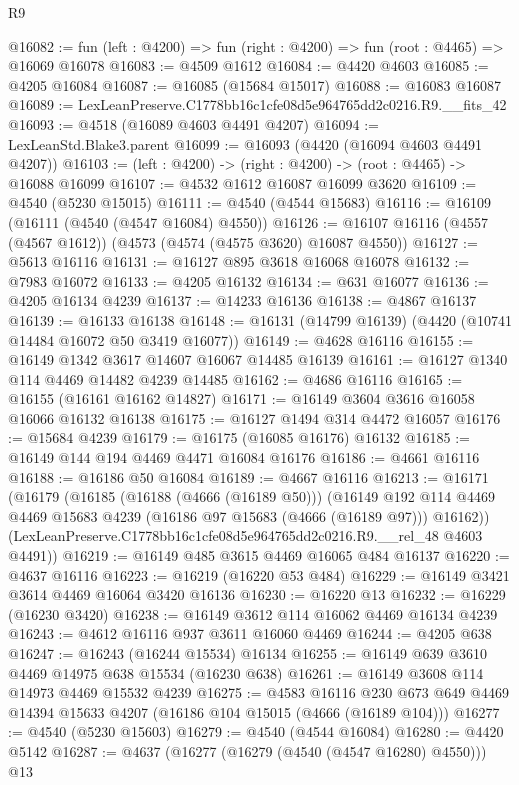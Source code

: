\begin{lexlean}{R9}
\begin{coremodule}
@16082 := fun (left : @4200) => fun (right : @4200) => fun (root : @4465) => @16069 @16078
@16083 := @4509 @1612
@16084 := @4420 @4603
@16085 := @4205 @16084
@16087 := @16085 (@15684 @15017)
@16088 := @16083 @16087
@16089 := LexLeanPreserve.C1778bb16c1cfe08d5e964765dd2c0216.R9.__fits_42
@16093 := @4518 (@16089 @4603 @4491 @4207)
@16094 := LexLeanStd.Blake3.parent
@16099 := @16093 (@4420 (@16094 @4603 @4491 @4207))
@16103 := (left : @4200) -> (right : @4200) -> (root : @4465) -> @16088 @16099
@16107 := @4532 @1612 @16087 @16099 @3620
@16109 := @4540 (@5230 @15015)
@16111 := @4540 (@4544 @15683)
@16116 := @16109 (@16111 (@4540 (@4547 @16084) @4550))
@16126 := @16107 @16116 (@4557 (@4567 @1612)) (@4573 (@4574 (@4575 @3620) @16087 @4550))
@16127 := @5613 @16116
@16131 := @16127 @895 @3618 @16068 @16078
@16132 := @7983 @16072
@16133 := @4205 @16132
@16134 := @631 @16077
@16136 := @4205 @16134 @4239
@16137 := @14233 @16136
@16138 := @4867 @16137
@16139 := @16133 @16138
@16148 := @16131 (@14799 @16139) (@4420 (@10741 @14484 @16072 @50 @3419 @16077))
@16149 := @4628 @16116
@16155 := @16149 @1342 @3617 @14607 @16067 @14485 @16139
@16161 := @16127 @1340 @114 @4469 @14482 @4239 @14485
@16162 := @4686 @16116
@16165 := @16155 (@16161 @16162 @14827)
@16171 := @16149 @3604 @3616 @16058 @16066 @16132 @16138
@16175 := @16127 @1494 @314 @4472 @16057
@16176 := @15684 @4239
@16179 := @16175 (@16085 @16176) @16132
@16185 := @16149 @144 @194 @4469 @4471 @16084 @16176
@16186 := @4661 @16116
@16188 := @16186 @50 @16084
@16189 := @4667 @16116
@16213 := @16171
    (@16179
      (@16185
        (@16188 (@4666 (@16189 @50)))
        (@16149 @192 @114 @4469 @4469 @15683 @4239 (@16186 @97 @15683 (@4666 (@16189 @97))) @16162))
      (LexLeanPreserve.C1778bb16c1cfe08d5e964765dd2c0216.R9.__rel_48 @4603 @4491))
@16219 := @16149 @485 @3615 @4469 @16065 @484 @16137
@16220 := @4637 @16116
@16223 := @16219 (@16220 @53 @484)
@16229 := @16149 @3421 @3614 @4469 @16064 @3420 @16136
@16230 := @16220 @13
@16232 := @16229 (@16230 @3420)
@16238 := @16149 @3612 @114 @16062 @4469 @16134 @4239
@16243 := @4612 @16116 @937 @3611 @16060 @4469
@16244 := @4205 @638
@16247 := @16243 (@16244 @15534) @16134
@16255 := @16149 @639 @3610 @4469 @14975 @638 @15534 (@16230 @638)
@16261 := @16149 @3608 @114 @14973 @4469 @15532 @4239
@16275 := @4583
    @16116
    @230
    @673
    @649
    @4469
    @14394
    @15633
    @4207
    (@16186 @104 @15015 (@4666 (@16189 @104)))
@16277 := @4540 (@5230 @15603)
@16279 := @4540 (@4544 @16084)
@16280 := @4420 @5142
@16287 := @4637 (@16277 (@16279 (@4540 (@4547 @16280) @4550))) @13

\end{coremodule}
\end{lexlean}
